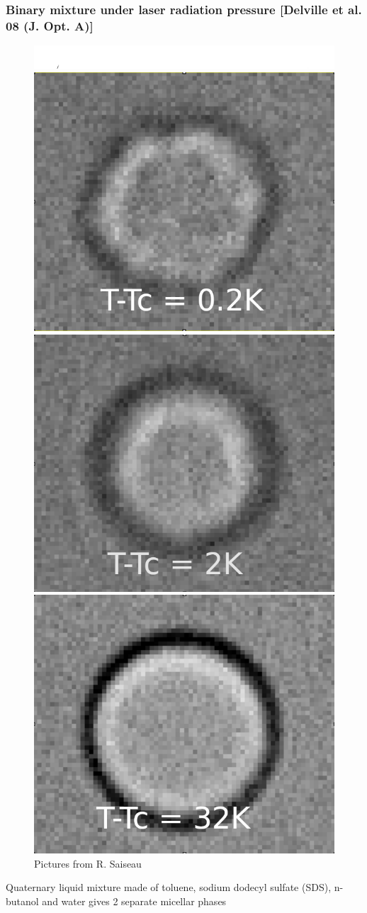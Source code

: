 \documentclass[9pt, dvipsnames]{beamer} %
\begin{document}
\begin{frame}
    \frametitle{Binary mixture under laser radiation pressure [Delville et al. 08 (J. Opt. A)]}
    \centering
    \begin{figure}
    \centering
    	\includegraphics[width=\linewidth]{Phantom_38,0cmnew_obj_x20OlyFLN_fps_1000_10K_bkup_3,2mum--00.png}
    	\includegraphics[width=0.3\linewidth]{02_K_70x60_70,5cm.png}
    	\includegraphics[width=0.3\linewidth]{2_K_70x60_69,4cm.png}
    	\includegraphics[width=0.3\linewidth]{32_K_70x60_71,0cm.png}  \\
    	{\footnotesize  Pictures from R. Saiseau}
    \end{figure}
    {\small Quaternary liquid mixture made of toluene, sodium dodecyl sulfate (SDS), n-butanol and water gives 2 separate micellar phases } \\
\end{frame}
\end{document}
